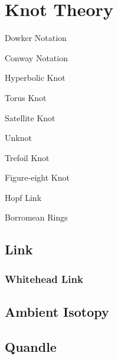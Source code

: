 \section{Knot Theory} \label{sec:knot_theory}

Dowker Notation

Conway Notation



Hyperbolic Knot

Torus Knot

Satellite Knot



Unknot

Trefoil Knot

Figure-eight Knot

Hopf Link

Borromean Rings



\subsection{Link} \label{sec:link}

\subsubsection{Whitehead Link} \label{sec:whitehead_link}



\subsection{Ambient Isotopy} \label{sec:ambient_isotopy}

\subsection{Quandle} \label{sec:quandle}



